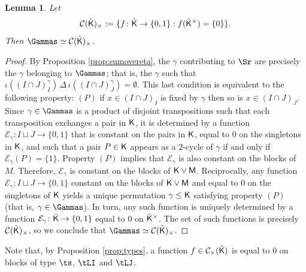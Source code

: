 \documentclass[11pt, a4paper, oneside, reqno]{amsart}
\newcommand{\sK}{{\sf K}}
\newcommand{\sM}{{\sf M}}
\newtheorem{lemma}[theorem]{Lemma}
\theoremstyle{remark}
\theoremstyle{definition}
\numberwithin{equation}{section}
\begin{document}
\begin{lemma}
	Let
	$$
		\mathcal{C}(\tilde{\sK})_\times := \{ f \colon {\tilde{\sK}}\to \{0,1\}: f(\tilde{\sK}^{\times}) = \{0\} \}.
	$$
	Then $\Gammas \simeq \mathcal{C}(\tilde{\sK})_\times$.

\end{lemma}
\begin{proof}
	By Proposition \ref{prop:sumovereta}, the $\gamma$ contributing to $\Sr$ are precisely the $\gamma$ belonging to $\Gammas$; that is, the $\gamma$ such that $\iota((I\cap J)_I^{\gamma}) \,\Delta \,\iota((I\cap J)^{\gamma}_J) = \emptyset$. This last condition is equivalent to the following property: $(P)$ if $x \in (I\cap J)_I$ is fixed by $\gamma$ then so is $x \in (I\cap J)_J$. Since $\gamma \in \Gammas$ is a product of disjoint transpositions such that each transposition exchanges a pair in $\sK$, it is determined by a function $\mathcal{E}_{\gamma} : I\sqcup J \to \{0,1\}$ that is constant on the pairs in $\sK$, equal to ${0}$ on the singletons in $\sK$, and such that a pair $P \in \sK$ appears as a $2$-cycle of $\gamma$ if and only if $\mathcal{E}_{\gamma}(P)=\{1\}$. Property $(P)$ implies that $\mathcal{E}_{\gamma}$ is also constant on the blocks of $M$. Therefore, $\mathcal{E}_{\gamma}$ is constant on the blocks of $\sK \vee \sM$. Reciprocally, any function $\mathcal{E}_{\gamma} \colon I \sqcup J \rightarrow \{0,1\}$ constant on the blocks of $\sK \vee \sM$ and equal to $0$ on the singletons of $\sK$ yields a unique permutation $\gamma \leq \sK$ satisfying property $(P)$ (that is, $\gamma \in \Gammas$). In turn, any such function is uniquely determined by a function $\mathcal{E}_{\gamma}\colon {\tilde \sK} \to \{0,1\}$ equal to $0$ on ${\tilde \sK}^{\times}$. The set of such functions is precisely $\mathcal{C}(\tilde{\sK})_\times$, so we conclude that $\Gammas \simeq \mathcal{C}(\tilde{\sK})_\times$.
\end{proof}
Note that, by Proposition \ref{prop:types}, a function $f \in \mathcal{C}_{\times}(\tilde{\sK})$ is equal to $0$ on blocks of type $\ts$, $\tLI$ and $\tLJ$. 
\end{document}
